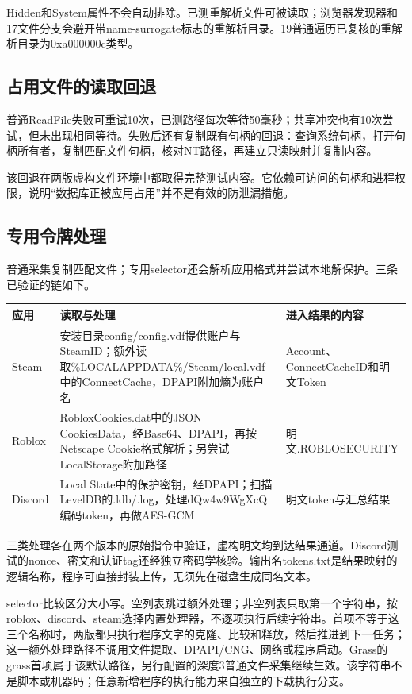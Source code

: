 \documentclass[UTF8,a4paper,zihao=5,fontset=windows]{ctexart}
\newcommand{\code}[1]{{\ttfamily\small #1}}
\begin{document}
Hidden和System属性不会自动排除。已测重解析文件可被读取；浏览器发现器和17文件分支会避开带name-surrogate标志的重解析目录。19普通遍历已复核的重解析目录为\code{0xa000000c}类型。

\subsection{占用文件的读取回退}
普通\code{ReadFile}失败可重试10次，已测路径每次等待50毫秒；共享冲突也有10次尝试，但未出现相同等待。失败后还有复制既有句柄的回退：查询系统句柄，打开句柄所有者，复制匹配文件句柄，核对NT路径，再建立只读映射并复制内容。

该回退在两版虚构文件环境中都取得完整测试内容。它依赖可访问的句柄和进程权限，说明“数据库正被应用占用”并不是有效的防泄漏措施。

\subsection{专用令牌处理}
普通采集复制匹配文件；专用selector还会解析应用格式并尝试本地解保护。三条已验证的链如下。
\begin{longtable}{@{}L{22mm}L{78mm}L{50mm}@{}}\toprule 应用 & 读取与处理 & 进入结果的内容\\\midrule\endhead
Steam & 安装目录\code{config/config.vdf}提供账户与SteamID；额外读取\code{\%LOCALAPPDATA\%/Steam/local.vdf}中的ConnectCache，DPAPI附加熵为账户名 & Account、ConnectCacheID和明文Token\\
Roblox & \code{RobloxCookies.dat}中的JSON \code{CookiesData}，经Base64、DPAPI，再按Netscape Cookie格式解析；另尝试LocalStorage附加路径 & 明文\code{.ROBLOSECURITY}\\
Discord & \code{Local State}中的保护密钥，经DPAPI；扫描LevelDB的\code{.ldb/.log}，处理\code{dQw4w9WgXcQ}编码token，再做AES-GCM & 明文token与汇总结果\\\bottomrule\end{longtable}

三类处理各在两个版本的原始指令中验证，虚构明文均到达结果通道。Discord测试的nonce、密文和认证tag还经独立密码学核验。输出名\code{tokens.txt}是结果映射的逻辑名称，程序可直接封装上传，无须先在磁盘生成同名文本。

selector比较区分大小写。空列表跳过额外处理；非空列表只取第一个字符串，按\code{roblox}、\code{discord}、\code{steam}选择内置处理器，不逐项执行后续字符串。首项不等于这三个名称时，两版都只执行程序文字的克隆、比较和释放，然后推进到下一任务；这一额外处理路径不调用文件提取、DPAPI/CNG、网络或程序启动。Grass的\code{grass}首项属于该默认路径，另行配置的深度3普通文件采集继续生效。该字符串不是脚本或机器码；任意新增程序的执行能力来自独立的下载执行分支。
\end{document}
